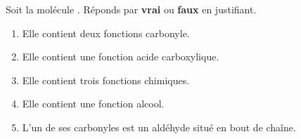 \documentclass[11pt,a4paper]{article}
\begin{document}
\begin{exo}
Soit la molécule . Réponds par \textbf{vrai} ou \textbf{faux} en justifiant.
\begin{enumerate}[label=\alph*)]
  \item Elle contient deux fonctions carbonyle.
  \item Elle contient une fonction acide carboxylique.
  \item Elle contient trois fonctions chimiques.
  \item Elle contient une fonction alcool.
  \item L'un de ses carbonyles est un aldéhyde situé en bout de chaîne.
\end{enumerate}
\end{exo}
\end{document}
